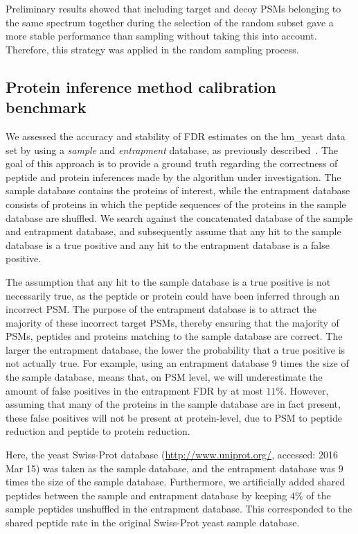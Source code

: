 \documentclass{article}
\begin{document}
Preliminary results showed that including target and decoy PSMs 
belonging to the same spectrum together during the selection of the 
random subset gave a more stable performance than sampling without 
taking this into account. Therefore, this strategy was applied in the 
random sampling process.

\subsection*{Protein inference method calibration benchmark}

We assessed the accuracy and stability of FDR estimates on the 
hm\_yeast data set by using a {\em sample} and {\em entrapment} 
database, as previously described~\cite{granholm2013determining}. The 
goal of this approach is to provide a ground truth regarding the 
correctness of peptide and protein inferences made by the algorithm 
under investigation. The sample database contains the proteins of 
interest, while the entrapment database consists of proteins in which 
the peptide sequences of the proteins in the sample database are 
shuffled. We search against the concatenated database of the sample 
and entrapment database, and subsequently assume that any hit to the 
sample database is a true positive and any hit to the entrapment 
database is a false positive. 

The assumption that any hit to the sample database is a true positive 
is not necessarily true, as the peptide or protein could have been 
inferred through an incorrect PSM. The purpose of the entrapment 
database is to attract the majority of these incorrect target PSMs, 
thereby ensuring that the majority of PSMs, peptides and proteins 
matching to the sample database are correct. The larger the entrapment 
database, the lower the probability that a true positive is not 
actually true. For example, using an entrapment database $9$ times the 
size of the sample database, means that, on PSM level, we will 
underestimate the amount of false positives in the entrapment FDR by 
at most $11\%$. However, assuming that many of the proteins in the 
sample database are in fact present, these false positives will not 
be present at protein-level, due to PSM to peptide reduction and 
peptide to protein reduction.

Here, the yeast Swiss-Prot database (\url{http://www.uniprot.org/}, 
accessed: 2016 Mar 15) was taken as the sample database, and the 
entrapment database was $9$ times the size of the sample database. 
Furthermore, we artificially added shared peptides between the sample 
and entrapment database by keeping $4\%$ of the sample peptides 
unshuffled in the entrapment database. This corresponded to the 
shared peptide rate in the original Swiss-Prot yeast sample database.
\end{document}
